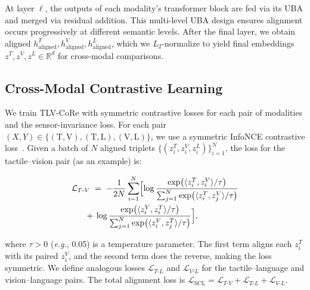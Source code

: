 \documentclass[letterpaper]{article} %
\theoremstyle{definition}                %
\theoremstyle{plain}                     %
\theoremstyle{remark}                    %
\begin{document}
At layer $\ell$, the outputs of each modality’s transformer block are fed via its UBA and merged via residual addition. This multi-level UBA design ensures alignment occurs progressively at different semantic levels. After the final layer, we obtain aligned $h^T_{\mathrm{aligned}}, h^V_{\mathrm{aligned}}, h^L_{\mathrm{aligned}}$, which we $L_2$-normalize to yield final embeddings $z^T,z^V,z^L\in \mathbb{R}^d$ for cross-modal comparisons.



\subsection{Cross-Modal Contrastive Learning}
We train TLV-CoRe with symmetric contrastive losses for each pair of modalities and the sensor-invariance loss. For each pair $(X,Y)\in \{(\mathrm{T},\mathrm{V}),(\mathrm{T},\mathrm{L}),(\mathrm{V},\mathrm{L})\}$, we use a symmetric InfoNCE contrastive loss~\cite{oord2018representation}. Given a batch of $N$ aligned triplets $\{(z^T_i,z^V_i,z^L_i)\}_{i=1}^N$, the loss for the tactile--vision pair (as an example) is:

\begin{equation}
\begin{aligned}
&\mathcal{L}_{T\text{-}V} \;=\; -\frac{1}{2N}\sum_{i=1}^{N}\Bigl[
    \log\frac{\exp\bigl(\langle z^{T}_{i}, z^{V}_{i}\rangle/\tau\bigr)}
             {\sum_{j=1}^{N}\exp\bigl(\langle z^{T}_{i}, z^{V}_{j}\rangle/\tau\bigr)}
\\
&\hspace{1.6em}+\,\log\frac{\exp\bigl(\langle z^{V}_{i}, z^{T}_{i}\rangle/\tau\bigr)}
                  {\sum_{j=1}^{N}\exp\bigl(\langle z^{V}_{i}, z^{T}_{j}\rangle/\tau\bigr)}
\Bigr],
\end{aligned}
\end{equation}




where $\tau>0$ (\textit{e.g.}, 0.05) is a temperature parameter. The first term aligns each $z^T_i$ with its paired $z^V_i$, and the second term does the reverse, making the loss symmetric. We define analogous losses $\mathcal{L}_{T\text{-}L}$ and $\mathcal{L}_{V\text{-}L}$ for the tactile--language and vision--language pairs. The total alignment loss is 
$\mathcal{L}_{\text{SCL}} = \mathcal{L}_{T\text{-}V} + \mathcal{L}_{T\text{-}L} + \mathcal{L}_{V\text{-}L}$.
\end{document}
